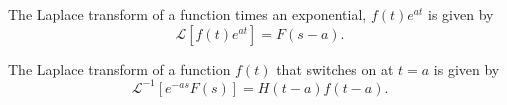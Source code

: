 \documentclass[nobib,notoc]{tufte-handout}
\begin{document}
\begin{defi}
	The Laplace transform of a function times an exponential, \(f(t)e^{at}\) is given by
	\begin{equation*}
		\mathcal{L}[f(t)e^{at}]=F(s-a).
	\end{equation*}
\end{defi}
\begin{defi}
	The Laplace transform of a function \(f(t)\) that switches on at \(t=a\) is given by
	\begin{equation*}
		\mathcal{L}^{-1}[e^{-as}F(s)]=H(t-a)f(t-a).
	\end{equation*}
\end{defi}
\end{document}
